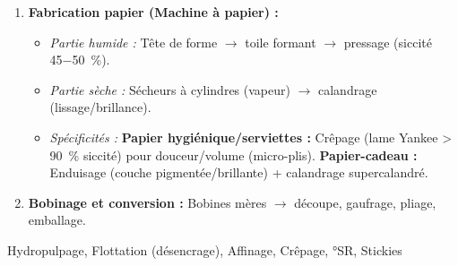 \documentclass[11pt]{article}
\newcommand{\cle}[1]{{\popxbold\color{popdark}#1}}
\begin{document}
\begin{methode}
\begin{enumerate}
    \item \textbf{Fabrication papier (Machine à papier) :} 
    \begin{itemize}
        \item \textit{Partie humide :} Tête de forme $\rightarrow$ toile formant $\rightarrow$ pressage (siccité \SI{45-50}{\%}).
        \item \textit{Partie sèche :} Sécheurs à cylindres (vapeur) $\rightarrow$ calandrage (lissage/brillance).
        \item \textit{Spécificités :} \textbf{Papier hygiénique/serviettes :} Crêpage (lame Yankee \SI{> 90}{\%} siccité) pour douceur/volume (micro-plis). \textbf{Papier-cadeau :} Enduisage (couche pigmentée/brillante) + calandrage supercalandré.
    \end{itemize}
    \item \textbf{Bobinage et conversion :} Bobines mères $\rightarrow$ découpe, gaufrage, pliage, emballage.
\end{enumerate}
\cle{Hydropulpage}, \cle{Flottation (désencrage)}, \cle{Affinage}, \cle{Crêpage}, \cle{°SR}, \cle{Stickies}
\end{methode}
\end{document}
